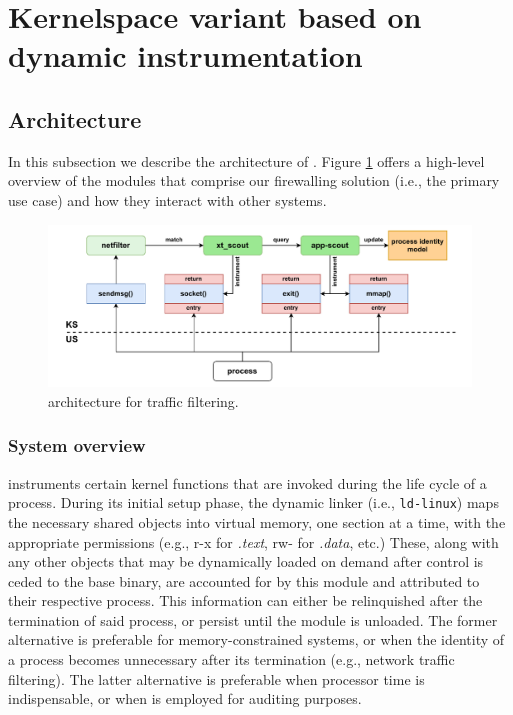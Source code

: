 \section{Kernelspace variant based on dynamic instrumentation}
\label{appfw:appscout}

\subsection{Architecture}
\label{apffw:appscout:architecture}

In this subsection we describe the architecture of \scout{}. Figure
\ref{appfw:appscout:fig:sys-architecture} offers a high-level overview of the
modules that comprise our firewalling solution (i.e., the primary use case) and
how they interact with other systems.

\begin{figure}
    \centering
    \includegraphics[width=\textwidth,keepaspectratio]{figures/appscout-architecture.pdf}
    \caption{\scout{} architecture for traffic filtering.}
    \label{appfw:appscout:fig:sys-architecture}
\end{figure}


\subsubsection{System overview}

\scout{} instruments certain kernel functions that are invoked during the life
cycle of a process. During its initial setup phase, the dynamic linker (i.e.,
\texttt{ld-linux}) maps the necessary shared objects into virtual memory, one
section at a time, with the appropriate permissions (e.g., r-x for
\textit{.text}, rw- for \textit{.data}, etc.) These, along with any other
objects that may be dynamically loaded on demand after control is ceded to the
base binary, are accounted for by this module and attributed to their respective
process. This information can either be relinquished after the termination of
said process, or persist until the module is unloaded. The former alternative is
preferable for memory-constrained systems, or when the identity of a process
becomes unnecessary after its termination (e.g., network traffic filtering).
The latter alternative is preferable when processor time is indispensable, or
when \scout{} is employed for auditing purposes.

